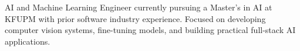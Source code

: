 

\begin{cvparagraph}

AI and Machine Learning Engineer currently pursuing a Master's in AI at KFUPM with prior software industry experience. Focused on developing computer vision systems, fine-tuning models, and building practical full-stack AI applications.

\end{cvparagraph}
